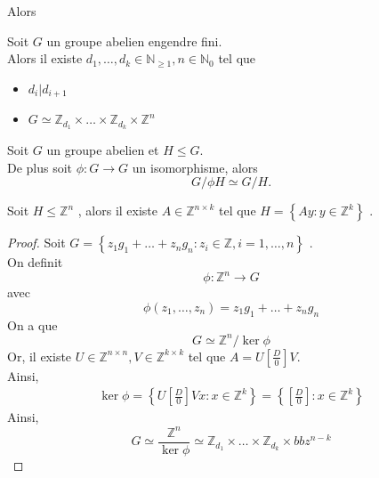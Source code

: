 \documentclass[../main.tex]{subfiles}
\begin{document}
Alors
\begin{thm}
	Soit $G$ un groupe abelien engendre fini.\\
	Alors il existe $ d_1, \ldots, d_k \in \mathbb{N}_{ \geq 1} , n \in \mathbb{N}_0 $ tel que
	\begin{itemize}
	\item $d_i|d_{i+1} $ 
	\item $G \simeq \mathbb{Z}_{d_1 } \times \ldots \times \mathbb{Z}_{d_k} \times \mathbb{Z}^{n}$
	\end{itemize}
\end{thm}
\begin{propo}
Soit $G$ un groupe abelien et $H \leq G.$ \\
De plus soit $\phi: G \to G$ un isomorphisme, alors
\[ 
G / \phi H \simeq G /H.
\]

\end{propo}
\begin{propo}
Soit $H \leq \mathbb{Z}^{n}$ , alors il existe $A \in \mathbb{Z}^{n\times k}$ tel que $H = \left\{ Ay: y \in \mathbb{Z}^{k} \right\} $ .
\end{propo}
\begin{proof}
Soit $G = \left\{ z_1 g_1 + \ldots + z_n g_n : z_i \in \mathbb{Z}, i = 1, \ldots,n \right\} $ .\\
On definit
\[ 
\phi: \mathbb{Z}^{n}\to G
\]
avec
\[ 
	\phi ( z_1, \ldots, z_n) = z_1 g_1 + \ldots + z_n g_n
\]
On a que
\[ 
G \simeq \mathbb{Z}^{n}/ \ker \phi
\]
Or, il existe $U \in \mathbb{Z}^{n\times n}, V \in \mathbb{Z}^{k\times k} $ tel que $A = U [ \frac{D}{0}] V$.\\
Ainsi,
\begin{align*}
\ker  \phi = \left\{ U [  \frac{D}{0}] V x: x \in \mathbb{Z}^{k} \right\} = \left\{ [ \frac{D}{0}] : x \in \mathbb{Z}^{k} \right\} 
\end{align*}
Ainsi,
\[ 
G \simeq \frac{\mathbb{Z}^{n}}{\ker \phi}\simeq \mathbb{Z}_{d_1} \times \ldots \times \mathbb{Z}_{d_k} \times bbz^{n-k }
\]



\end{proof}
\end{document}
